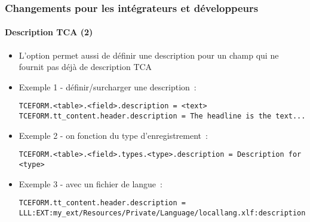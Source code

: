 \begin{frame}[fragile]
	\frametitle{Changements pour les intégrateurs et développeurs}
	\framesubtitle{Description TCA (2)}


	\begin{itemize}
		\item L'option permet aussi de définir une description pour un champ
			qui ne fournit pas déjà de description TCA
	\end{itemize}

	\begin{itemize}
		\item Exemple 1 - définir/surcharger une description~:
\begin{lstlisting}
TCEFORM.<table>.<field>.description = <text>
TCEFORM.tt_content.header.description = The headline is the text...
\end{lstlisting}
		\item Exemple 2 - on fonction du type d'enregistrement~:
\begin{lstlisting}
TCEFORM.<table>.<field>.types.<type>.description = Description for <type>
\end{lstlisting}
		\item Exemple 3 - avec un fichier de langue~:
\begin{lstlisting}
TCEFORM.tt_content.header.description = LLL:EXT:my_ext/Resources/Private/Language/locallang.xlf:description
\end{lstlisting}

	\end{itemize}

\end{frame}


